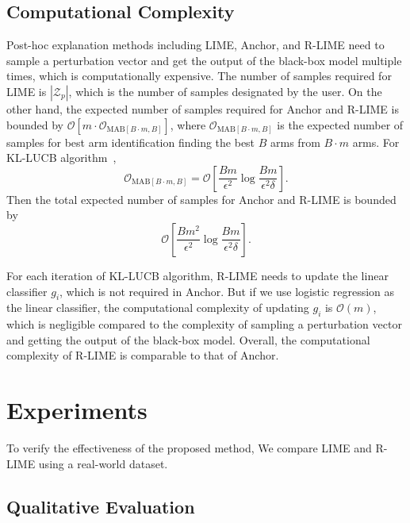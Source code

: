 \documentclass[11pt]{article}
\begin{document}

\ifnum{}
  \subsection{Computational Complexity}
  Post-hoc explanation methods including LIME, Anchor, and R-LIME
  need to sample a perturbation vector
  and get the output of the black-box model multiple times,
  which is computationally expensive.
  The number of samples required for LIME is $|\mathcal{Z}_p|$,
  which is the number of samples designated by the user.
  On the other hand,
  the expected number of samples required for Anchor and R-LIME is bounded by
  $\mathcal{O}[m\cdot\mathcal{O}_{\mathrm{MAB}[B\cdot m,B]}]$,
  where $\mathcal{O}_{\mathrm{MAB}[B\cdot m,B]}$
  is the expected number of samples
  for best arm identification finding the best $B$ arms from $B\cdot m$ arms.
  For KL-LUCB algorithm~\cite{kaufmann2013information},
  \begin{equation}
    \mathcal{O}_{\mathrm{MAB}[B\cdot m,B]}=
    \mathcal{O}\left[\frac{Bm}{\epsilon^2}\log\frac{Bm}{\epsilon^2\delta}\right].
  \end{equation}
  Then the total expected number of samples for Anchor and R-LIME is bounded by
  \begin{equation}
    \mathcal{O}\left[\frac{Bm^2}{\epsilon^2}\log\frac{Bm}{\epsilon^2\delta}\right].
  \end{equation}

  For each iteration of KL-LUCB algorithm, R-LIME needs to update
  the linear classifier $g_i$, which is not required in Anchor.
  But if we use logistic regression as the linear classifier,
  the computational complexity of updating $g_i$ is $\mathcal{O}(m)$,
  which is negligible compared to the complexity of sampling a perturbation vector
  and getting the output of the black-box model.
  Overall, the computational complexity of R-LIME is comparable to that of Anchor.
\fi

\section{Experiments}
To verify the effectiveness of the proposed method,
We compare LIME and R-LIME using a real-world dataset.

\subsection{Qualitative Evaluation}
\end{document}
